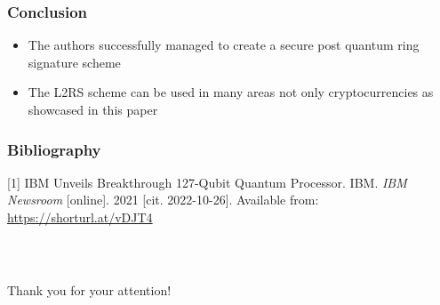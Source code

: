 \documentclass[%
  14pt,       				%
	c,                  %
	aspectratio=1610,   %
	unicode,						%
]{beamer}				    	%
\begin{document}
\begin{frame}
  \frametitle{Conclusion}
  \large{
    \begin{itemize}
      \item The authors successfully managed to create a secure post quantum ring signature scheme
      \item The L2RS scheme can be used in many areas not only cryptocurrencies as showcased in this paper
    \end{itemize}
  }
\end{frame}

\begin{frame}
  \frametitle{Bibliography}
  \small{
    [1] IBM Unveils Breakthrough 127-Qubit Quantum Processor. IBM. \textit{IBM Newsroom} [online]. 2021 [cit. 2022-10-26]. Available from: \url{https://shorturl.at/vDJT4}
  }
\end{frame}

\begin{frame}[c]
  \frametitle{\mbox{ }}
  \begin{center}
    {\Huge Thank you for your attention!}
  \end{center}
\end{frame}
\end{document}
